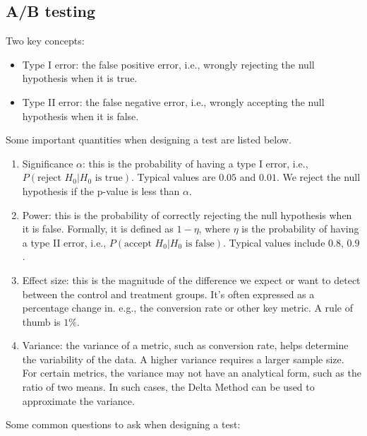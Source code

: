     \subsection{A/B testing}
        Two key concepts:
            \begin{itemize}
                \item Type I error: the false positive error, i.e., wrongly rejecting the null hypothesis when it is true.
                \item Type II error: the false negative error, i.e., wrongly accepting the null hypothesis when it is false. 
            \end{itemize}
        Some important quantities when designing a test are listed below.
            \begin{enumerate}
                \item Significance $\alpha$: this is the probability of having a type I error, i.e., $P(\text{reject $H_0$} | \text{$H_0$ is true} )$. Typical values are $0.05$ and $0.01$. We reject the null hypothesis if the p-value is less than $\alpha$.
                
                \item Power: this is the probability of correctly rejecting the null hypothesis when it is false. Formally, it is defined as $1 - \eta$, where $\eta$ is the probability of having a type II error, i.e., $P(\text{accept $H_0$} | \text{$H_0$ is false})$. Typical values include $0.8$, $0.9$.
                
                \item Effect size: this is the magnitude of the difference we expect or want to detect between the control and treatment groups. It's often expressed as a percentage change in. e.g.,  the conversion rate or other key metric. A rule of thumb is $1\%$.

                
                \item Variance: the variance of a metric, such as conversion rate, helps determine the variability of the data. A higher variance requires a larger sample size. For certain metrics, the variance may not have an analytical form, such as the ratio of two means. In such cases, the Delta Method can be used to approximate the variance.

                
            \end{enumerate}
        Some common questions to ask when designing a test:

